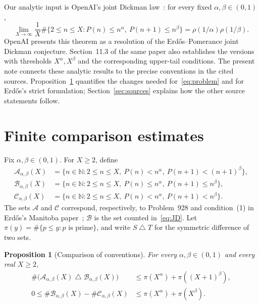 \documentclass[11pt,a4paper]{amsart}
\newtheorem{proposition}{Proposition}
\newcommand{\N}{\mathbb N}
\newcommand{\A}{\mathcal A}
\newcommand{\B}{\mathcal B}
\newcommand{\C}{\mathcal C}
\begin{document}
Our analytic input is OpenAI's joint Dickman
law~\cite[Theorem~1.1, p.~2]{OpenAI2026}: for every fixed
$\alpha,\beta\in(0,1)$,
\begin{equation}\label{eq:JD}
 \lim_{X\to\infty}\frac1X
 \#\{2\le n\le X:P(n)\le n^\alpha,\ P(n+1)\le n^\beta\}
 =\rho(1/\alpha)\rho(1/\beta).
\end{equation}
OpenAI presents this theorem as a resolution of the
Erd\H{o}s--Pomerance joint Dickman conjecture. Section~11.3 of the
same paper also establishes the versions with thresholds
$X^\alpha,X^\beta$ and the corresponding upper-tail conditions.
The present note connects these analytic results to the precise
conventions in the cited sources. Proposition~\ref{prop:comparison}
quantifies the changes needed for~\eqref{eq:problem} and for
Erd\H{o}s's strict formulation; Section~\ref{sec:sources} explains how
the other source statements follow.

\section{Finite comparison estimates}\label{sec:comparison}

Fix $\alpha,\beta\in(0,1)$. For $X\ge2$, define
\begin{align*}
 \A_{\alpha,\beta}(X)
   &=\{n\in\N:2\le n\le X,\ P(n)<n^\alpha,
                                \ P(n+1)<(n+1)^\beta\},\\
 \B_{\alpha,\beta}(X)
   &=\{n\in\N:2\le n\le X,\ P(n)\le n^\alpha,
                                \ P(n+1)\le n^\beta\},\\
 \C_{\alpha,\beta}(X)
   &=\{n\in\N:2\le n\le X,\ P(n)<n^\alpha,
                                \ P(n+1)<n^\beta\}.
\end{align*}
The sets $\A$ and $\C$ correspond, respectively, to Problem~928 and
condition~(1) in Erd\H{o}s's Manitoba paper~\cite[p.~25]{Erdos1976Manitoba};
$\B$ is the set counted in~\eqref{eq:JD}. Let
$\pi(y)=\#\{p\le y:p\text{ is prime}\}$, and write
$S\mathbin\triangle T$ for the symmetric difference of two sets.

\begin{proposition}[Comparison of conventions]\label{prop:comparison}
For every $\alpha,\beta\in(0,1)$ and every real $X\ge2$,
\begin{align}
 \#\bigl(\A_{\alpha,\beta}(X)\mathbin\triangle
          \B_{\alpha,\beta}(X)\bigr)
 &\le \pi(X^\alpha)+\pi((X+1)^\beta),\label{eq:AB}\\
 0\le\#\B_{\alpha,\beta}(X)-\#\C_{\alpha,\beta}(X)
 &\le \pi(X^\alpha)+\pi(X^\beta).\label{eq:BC}
\end{align}
\end{proposition}
\end{document}

